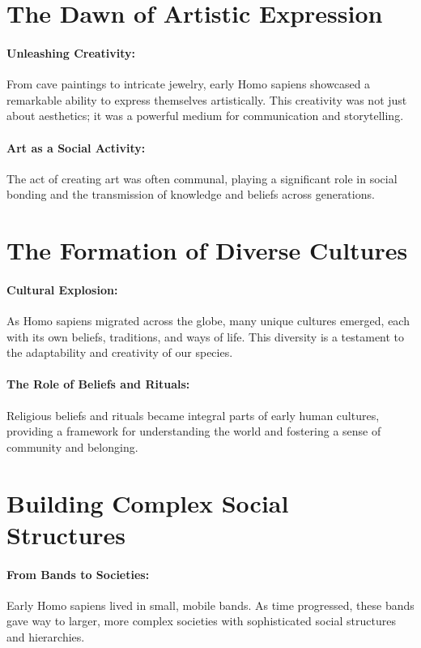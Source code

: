 \documentclass{book}
\begin{document}
\section*{The Dawn of Artistic Expression}

\paragraph{Unleashing Creativity:}
From cave paintings to intricate jewelry, early Homo sapiens showcased a remarkable ability to express themselves artistically. This creativity was not just about aesthetics; it was a powerful medium for communication and storytelling.

\paragraph{Art as a Social Activity:}
The act of creating art was often communal, playing a significant role in social bonding and the transmission of knowledge and beliefs across generations.

\section*{The Formation of Diverse Cultures}

\paragraph{Cultural Explosion:}
As Homo sapiens migrated across the globe, many unique cultures emerged, each with its own beliefs, traditions, and ways of life. This diversity is a testament to the adaptability and creativity of our species.

\paragraph{The Role of Beliefs and Rituals:}
Religious beliefs and rituals became integral parts of early human cultures, providing a framework for understanding the world and fostering a sense of community and belonging.

\section*{Building Complex Social Structures}

\paragraph{From Bands to Societies:}
Early Homo sapiens lived in small, mobile bands. As time progressed, these bands gave way to larger, more complex societies with sophisticated social structures and hierarchies.
\end{document}
